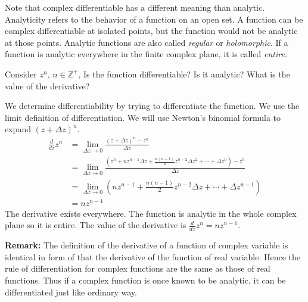 Note that complex differentiable has a different meaning than analytic.
Analyticity refers to the behavior of a function on an open set.  A function
can be complex differentiable at isolated points, but the function would
not be analytic at those points.
Analytic functions are also called \textit{regular} or \textit{holomorphic}.
If a function is analytic everywhere in the finite complex plane, it is 
called \textit{entire}.
\begin{example}
  \label{example11-1}
  Consider $z^n$, $n \in \mathbb{Z}^+$, Is the function differentiable?  
  Is it analytic? What is the value of the derivative?
\end{example}
\begin{solution}
  We determine differentiability by trying to differentiate the function.
  We use the limit definition of differentiation.  We will use Newton's 
  binomial formula to expand $(z + \Delta z)^n$.
  \begin{align*}
    \frac{d}{d z} z^n
    &= \lim_{\Delta z \to 0} \frac{ (z + \Delta z)^n - z^n }{ \Delta z } 
    \\
    &= \lim_{\Delta z \to 0} \frac{ \left( z^n + n z^{n-1} \Delta z
        + \frac{n (n-1)}{2} z^{n-2} \Delta z^2 + \cdots + \Delta z^n
      \right) - z^n }{ \Delta z } 
    \\
    &= \lim_{\Delta z \to 0} \left( n z^{n-1}
      + \frac{n (n-1)}{2} z^{n-2} \Delta z + \cdots + \Delta z^{n-1} \right) 
    \\
    &= n z^{n-1}
  \end{align*}
  The derivative exists everywhere.  The function is analytic in the whole
  complex plane so it is entire.  The value of the derivative is 
  $\frac{d}{dz}z^n = n z^{n-1}$.
\end{solution}

\textbf{Remark: } The definition of the derivative of a function of complex variable is identical in form of that the derivative of the function of real variable. Hence the rule of differentiation for complex functions are the same as those of real functions. Thus if a complex function is once known to be analytic, it can be differentiated just like ordinary way.


